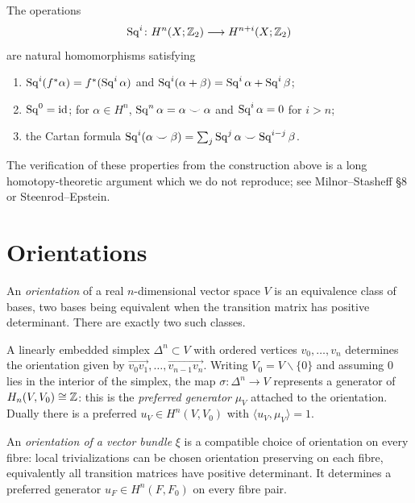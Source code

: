 \begin{theorem}\label{thm:sq-properties}
The operations
\[
\operatorname{Sq}^i\colon H^n(X;\mathbb{Z}_2)\longrightarrow H^{n+i}(X;\mathbb{Z}_2)
\]
are natural homomorphisms satisfying

\begin{enumerate}
\item $\operatorname{Sq}^i(f^*\alpha)=f^*(\operatorname{Sq}^i\alpha)$ and
$\operatorname{Sq}^i(\alpha+\beta)=\operatorname{Sq}^i\alpha+\operatorname{Sq}^i\beta$;
\item $\operatorname{Sq}^0=\mathrm{id}$; for $\alpha\in H^n$, $\operatorname{Sq}^n\alpha=\alpha\smile\alpha$
and $\operatorname{Sq}^i\alpha=0$ for $i>n$;
\item the Cartan formula
$\operatorname{Sq}^i(\alpha\smile\beta)=\sum_j\operatorname{Sq}^j\alpha\smile\operatorname{Sq}^{i-j}\beta$.
\end{enumerate}
\end{theorem}

The verification of these properties from the construction above is a long
homotopy-theoretic argument which we do not reproduce; see Milnor--Stasheff
\S 8 or Steenrod--Epstein.

\section{Orientations}

\begin{definition}
An \emph{orientation} of a real $n$-dimensional vector space $V$ is an
equivalence class of bases, two bases being equivalent when the transition
matrix has positive determinant. There are exactly two such classes.
\end{definition}

A linearly embedded simplex $\Delta^n\subset V$ with ordered vertices
$v_0,\dots,v_n$ determines the orientation given by
$\overrightarrow{v_0v_1},\dots,\overrightarrow{v_{n-1}v_n}$. Writing
$V_0=V\smallsetminus\{0\}$ and assuming $0$ lies in the interior of the simplex,
the map $\sigma\colon\Delta^n\to V$ represents a generator of
$H_n(V,V_0)\cong\mathbb{Z}$: this is the \emph{preferred generator} $\mu_V$ attached to
the orientation. Dually there is a preferred $u_V\in H^n(V,V_0)$ with
$\langle u_V,\mu_V\rangle=1$.

\begin{definition}
An \emph{orientation of a vector bundle} $\xi$ is a compatible choice of
orientation on every fibre: local trivializations can be chosen orientation
preserving on each fibre, equivalently all transition matrices have positive
determinant. It determines a preferred generator $u_F\in H^n(F,F_0)$ on every
fibre pair.
\end{definition}


